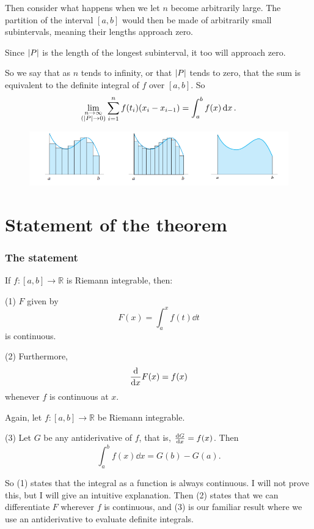 \documentclass[mathserif]{beamer}
\newcommand{\sbr}[1]{\left[#1\right]}
\begin{document}
\begin{frame}
  Then consider what happens when we let $n$ become arbitrarily large. The partition of the interval $\sbr{a,b}$ would then be made of arbitrarily small subintervals, meaning their lengths approach zero. 
  
  Since $\abs{P}$ is the length of the longest subinterval, it too will approach zero. 

  So we say that as $n$ tends to infinity, or that $\abs{P}$ tends to zero, that the sum is equivalent to the definite integral of $f$ over $\sbr{a,b}$. So $$\lim_{\substack{ n\to \infty \\ (\abs{P}\to 0)}} \sum_{i=1}^n f(t_i)(x_i-x_{i-1}) = \int_a^b f(x)\dd{x}.$$

  \begin{figure}[h]
    \centering
    \includegraphics[scale=0.5]{improve}
  \end{figure}

\end{frame}

\section{Statement of the theorem}

\begin{frame}
  \frametitle{The statement}
  \begin{theorem}
    If $f : \sbr{a,b} \to \mathbb{R}$ is Riemann integrable, then:
    
    (1) $F$ given by $$F(x) = \int_a^x f(t)\dd{t}$$ is continuous.
    
    (2) Furthermore, $$\dv{x}F(x) = f(x)$$  whenever $f$ is continuous at $x$.
  \end{theorem}
  
\end{frame}
  
\begin{frame}
  \begin{theorem}
    Again, let $f:\sbr{a,b}\to \mathbb{R}$ be Riemann integrable.

    (3) Let $G$ be any antiderivative of $f$, that is, $\dv{G}{x} = f(x)$. Then $$\int_a^b f(x)\dd{x} = G(b)-G(a).$$
  \end{theorem}

  So (1) states that the integral as a function is always continuous. I will not prove this, but I will give an intuitive explanation. Then (2) states that we can differentiate $F$ wherever $f$ is continuous, and (3) is our familiar result where we use an antiderivative to evaluate definite integrals.
\end{frame}
\end{document}
